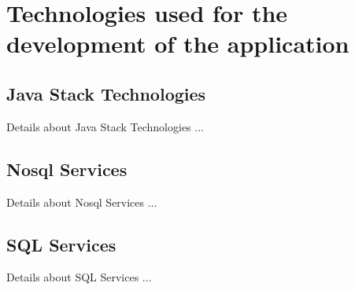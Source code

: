 \chapter{Technologies used for the development of the application}\label{sect:technologies}

\section {Java Stack Technologies}
\tab Details about Java Stack Technologies ...
\newline

\section {Nosql Services}
\tab Details about Nosql Services ...
\newline

\section {SQL Services}
\tab Details about SQL Services ...
\newline

